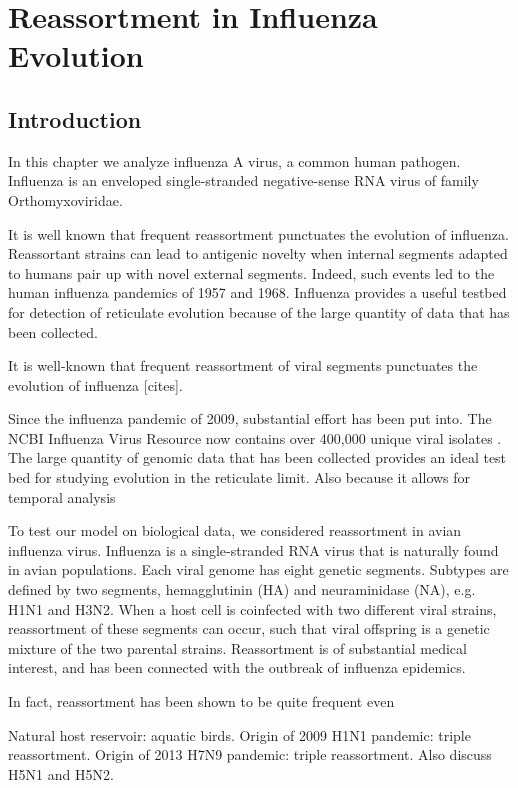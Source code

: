 
\chapter{Reassortment in Influenza Evolution}
\label{ch:influenza}

\section{Introduction}
\label{flu:introduction}

In this chapter we analyze influenza A virus, a common human pathogen.
Influenza is an enveloped single-stranded negative-sense RNA virus of family Orthomyxoviridae.


It is well known that frequent reassortment punctuates the evolution of influenza.
Reassortant strains can lead to antigenic novelty when internal segments adapted to humans pair up with novel external segments.
Indeed, such events led to the human influenza pandemics of 1957 and 1968.
Influenza provides a useful testbed for detection of reticulate evolution because of the large quantity of data that has been collected.

It is well-known that frequent reassortment of viral segments punctuates the evolution of influenza [cites].

Since the influenza pandemic of 2009, substantial effort has been put into.
The NCBI Influenza Virus Resource now contains over 400,000 unique viral isolates \cite{Bao:2008cq}.
The large quantity of genomic data that has been collected provides an ideal test bed for studying evolution in the reticulate limit.
Also because it allows for temporal analysis 

To test our model on biological data, we considered reassortment in avian influenza virus.
Influenza is a single-stranded RNA virus that is naturally found in avian populations.
Each viral genome has eight genetic segments.
Subtypes are defined by two segments, hemagglutinin (HA) and neuraminidase (NA), e.g. H1N1 and H3N2.
When a host cell is coinfected with two different viral strains, reassortment of these segments can occur, such that viral offspring is a genetic mixture of the two parental strains.
Reassortment is of substantial medical interest, and has been connected with the outbreak of influenza epidemics.

In fact, reassortment has been shown to be quite frequent even 

Natural host reservoir: aquatic birds.
Origin of 2009 H1N1 pandemic: triple reassortment.
Origin of 2013 H7N9 pandemic: triple reassortment.
Also discuss H5N1 and H5N2.

